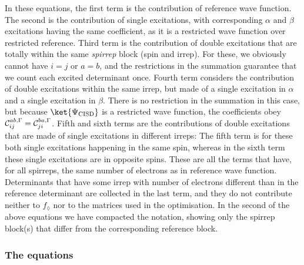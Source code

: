 \documentclass[a4paper,11pt]{article}
\begin{document}
In these equations, the first term is the contribution of reference wave function.
The second is the contribution of single excitations, with corresponding $\alpha$ and $\beta$ excitations having the same coefficient, as it is a restricted wave function over restricted reference.
Third term is the contribution of double excitations that are totally within the same \emph{spirrep} block (spin and irrep). For these, we obviously cannot have $i=j$ or $a=b$, and the restrictions in the summation guarantee that we count each excited determinant once.
Fourth term considers the contribution of double excitations within the same irrep, but made of a single excitation in $\alpha$ and a single excitation in $\beta$.
There is no restriction in the summation in this case, but because $\ket{\Psi_\text{CISD}}$ is a restricted wave function, the coefficients obey $\mathcal{C}_{ij}^{ab, \Gamma} =  \mathcal{C}_{ji}^{ba, \Gamma}$.
Fifth and sixth terms are the contributions of double excitations that are made of single excitations in different irreps:
The fifth term is for these both single excitations happening in the same spin, whereas in the sixth term these single excitations are in opposite spins.
These are all the terms that have, for all spirreps, the same number of electrons as in reference wave function.
Determinants that have some irrep with number of electrons different than in the reference determinant are collected in the last term, and they do not contribute neither to $f_\lozenge$ nor to the matrices used in the optimisation.
In the second of the above equations we have compacted the notation, showing only the spirrep block(s) that differ from the corresponding reference block. 

\subsubsection{The equations}
\end{document}
